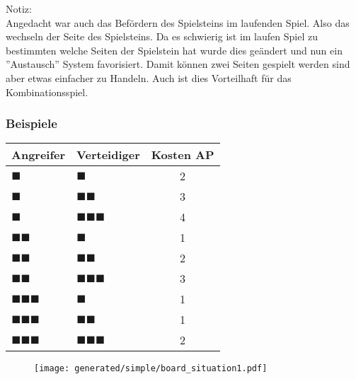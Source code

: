 \documentclass{article}
\begin{document}
	\vspace*{0.2cm}
	
	\begin{flushleft}
	Notiz:\\
	Angedacht war auch das Befördern des Spielsteins im laufenden Spiel. Also das wechseln
	der Seite des Spielsteins. Da es schwierig ist im laufen Spiel zu bestimmten welche Seiten 
	der Spielstein hat wurde dies geändert und nun ein ''Austausch'' System favorisiert.
	Damit können zwei Seiten gespielt werden sind aber etwas einfacher zu Handeln. Auch 
	ist dies Vorteilhaft für das Kombinationsspiel.
	\end{flushleft}
	
	
	\subsubsection*{Beispiele}
	
	\begin{tabular}{llc}
	Angreifer & Verteidiger & Kosten AP \\ \hline 
	$\blacksquare$ & $\blacksquare$ & 2 \\
	$\blacksquare$ & $\blacksquare\blacksquare$ & 3 \\
	$\blacksquare$ & $\blacksquare\blacksquare\blacksquare$ & 4 \\
	
	$\blacksquare\blacksquare$ & $\blacksquare$ & 1 \\ 
	$\blacksquare\blacksquare$ & $\blacksquare\blacksquare$ & 2 \\ 
	$\blacksquare\blacksquare$ & $\blacksquare\blacksquare\blacksquare$ & 3 \\ 
	
	$\blacksquare\blacksquare\blacksquare$ & $\blacksquare$ & 1 \\ 
	$\blacksquare\blacksquare\blacksquare$ & $\blacksquare\blacksquare$ & 1 \\ 
	$\blacksquare\blacksquare\blacksquare$ & $\blacksquare\blacksquare\blacksquare$ & 2 \\ 
	\end{tabular} 
	
	
	\begin{figure}[h]
	\texttt{[image: generated/simple/board\_situation1.pdf]}
	\end{figure}
	
\end{document}
